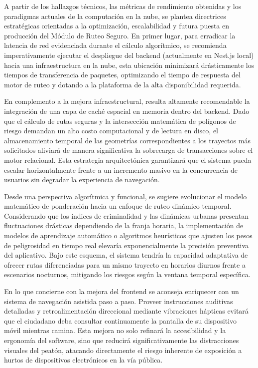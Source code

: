 A partir de los hallazgos técnicos, las métricas de rendimiento obtenidas y los paradigmas actuales de la computación en la nube, se plantea directrices estratégicas orientadas a la optimización, escalabilidad y futura puesta en producción del Módulo de Ruteo Seguro. En primer lugar, para erradicar la latencia de red evidenciada durante el cálculo algorítmico, se recomienda imperativamente ejecutar el despliegue del backend (actualmente en Nest.js local) hacia una infraestructura en la nube, esta ubicación  minimizará drásticamente los tiempos de transferencia de paquetes, optimizando el tiempo de respuesta del motor de ruteo y dotando a la plataforma de la alta disponibilidad requerida.

En complemento a la mejora infraestructural, resulta altamente recomendable la integración de una capa de caché espacial en memoria dentro del backend. Dado que el cálculo de rutas seguras y la intersección matemática de polígonos de riesgo demandan un alto costo computacional y de lectura en disco, el almacenamiento temporal de las geometrías correspondientes a los trayectos más solicitados aliviará de manera significativa la sobrecarga de transacciones sobre el motor relacional. Esta estrategia arquitectónica garantizará que el sistema pueda escalar horizontalmente frente a un incremento masivo en la concurrencia de usuarios sin degradar la experiencia de navegación.

Desde una perspectiva algorítmica y funcional, se sugiere evolucionar el modelo matemático de ponderación hacia un enfoque de ruteo dinámico temporal. Considerando que los índices de criminalidad y las dinámicas urbanas presentan fluctuaciones drásticas dependiendo de la franja horaria, la implementación de modelos de aprendizaje automático o algoritmos heurísticos que ajusten los pesos de peligrosidad en tiempo real elevaría exponencialmente la precisión preventiva del aplicativo. Bajo este esquema, el sistema tendría la capacidad adaptativa de ofrecer rutas diferenciadas para un mismo trayecto en horarios diurnos frente a escenarios nocturnos, mitigando los riesgos según la ventana temporal específica.

En lo que concierne con la mejora del frontend se aconseja enriquecer con un sistema de navegación asistida paso a paso. Proveer instrucciones auditivas detalladas y retroalimentación direccional mediante vibraciones hápticas evitará que el ciudadano deba consultar continuamente la pantalla de su dispositivo móvil mientras camina. Esta mejora no solo refinará la accesibilidad y la ergonomía del software, sino que reducirá significativamente las distracciones visuales del peatón, atacando directamente el riesgo inherente de exposición a hurtos de dispositivos electrónicos en la vía pública.
